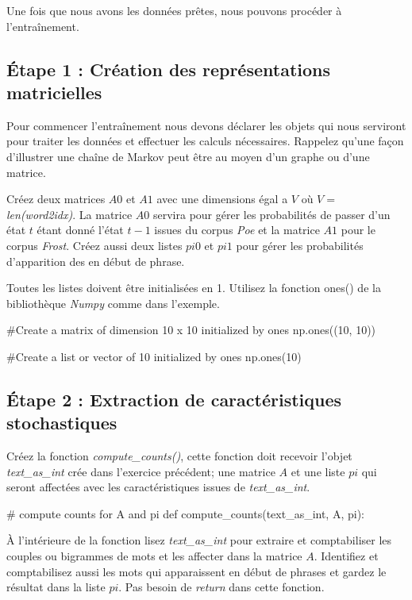Une fois que nous avons les données prêtes, nous pouvons procéder à l'entraînement.

\subsection{Étape 1 : Création des représentations matricielles}
Pour commencer l'entraînement nous devons déclarer les objets qui nous serviront pour traiter les données et effectuer les calculs nécessaires. Rappelez qu'une façon d’illustrer une chaîne de Markov peut être au moyen d'un graphe ou d'une matrice.

Créez deux matrices $A0$ et $A1$ avec une dimensions égal a $V$ où $V = $ \textit{len(word2idx)}. La matrice $A0$ servira pour gérer les probabilités de passer d'un état $t$ étant donné l'état $t-1$ issues du corpus \textit{Poe} et la matrice $A1$ pour le corpus \textit{Frost}. Créez aussi deux listes $pi0$ et $pi1$ pour gérer les probabilités d'apparition des en début de phrase.

Toutes les listes doivent être initialisées en 1. Utilisez la fonction ones() de la bibliothèque \textit{Numpy} comme dans l'exemple.

\begin{python}
#Create a matrix of dimension 10 x 10 initialized by ones
np.ones((10, 10))

#Create a list or vector of 10 initialized by ones
np.ones(10)
\end{python}

\subsection{Étape 2 : Extraction de caractéristiques stochastiques}

Créez la fonction \textit{compute\_counts()}, cette fonction doit recevoir l'objet \textit{text\_as\_int} crée dans l'exercice précédent; une matrice $A$ et une liste $pi$ qui seront affectées avec les caractéristiques issues de \textit{text\_as\_int}.
\begin{python}
# compute counts for A and pi
def compute_counts(text_as_int, A, pi):
\end{python}

À l’intérieure de la fonction lisez \textit{text\_as\_int} pour extraire et comptabiliser les couples ou bigrammes de mots et les affecter dans la matrice $A$. Identifiez et comptabilisez aussi les mots qui apparaissent en début de phrases et gardez le résultat dans la liste $pi$. Pas besoin de \textit{return} dans cette fonction. 

